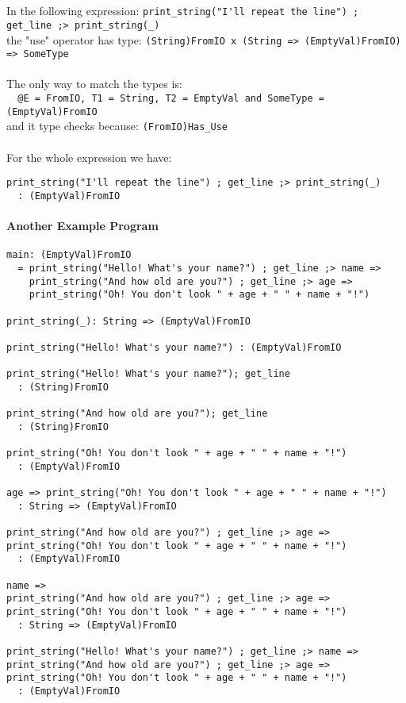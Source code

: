 \documentclass[diploma]{softlab-thesis}
\begin{document}
\\\\
In the following expression:
\verb|print_string("I'll repeat the line") ; get_line ;> print_string(_)|
\\
the "use" operator has type:
\verb|(String)FromIO x (String => (EmptyVal)FromIO) => SomeType|
\\\\
The only way to match the types is:
\\
\verb|  @E = FromIO, T1 = String, T2 = EmptyVal and SomeType = (EmptyVal)FromIO|
\\
and it type checks because: \verb|(FromIO)Has_Use|
\\\\
For the whole expression we have:
\begin{verbatim}
print_string("I'll repeat the line") ; get_line ;> print_string(_)
  : (EmptyVal)FromIO
\end{verbatim}

\newpage
\paragraph{Another Example Program}
\begin{verbatim}
main: (EmptyVal)FromIO
  = print_string("Hello! What's your name?") ; get_line ;> name =>
    print_string("And how old are you?") ; get_line ;> age =>
    print_string("Oh! You don't look " + age + " " + name + "!")

print_string(_): String => (EmptyVal)FromIO

print_string("Hello! What's your name?") : (EmptyVal)FromIO

print_string("Hello! What's your name?"); get_line
  : (String)FromIO

print_string("And how old are you?"); get_line
  : (String)FromIO

print_string("Oh! You don't look " + age + " " + name + "!")
  : (EmptyVal)FromIO

age => print_string("Oh! You don't look " + age + " " + name + "!")
  : String => (EmptyVal)FromIO

print_string("And how old are you?") ; get_line ;> age =>
print_string("Oh! You don't look " + age + " " + name + "!")
  : (EmptyVal)FromIO

name =>
print_string("And how old are you?") ; get_line ;> age =>
print_string("Oh! You don't look " + age + " " + name + "!")
  : String => (EmptyVal)FromIO

print_string("Hello! What's your name?") ; get_line ;> name =>
print_string("And how old are you?") ; get_line ;> age =>
print_string("Oh! You don't look " + age + " " + name + "!")
  : (EmptyVal)FromIO
\end{verbatim}
\end{document}
